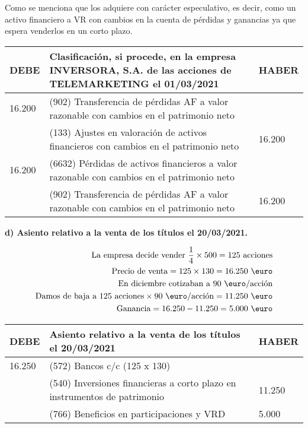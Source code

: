 Como se menciona que los adquiere con carácter especulativo, es decir, como un activo financiero a VR con cambios en la cuenta de pérdidas y ganancias ya que espera venderlos en un corto plazo.

\begin{table}[H]
    \centering
    \begin{tabular}{|p{3cm}|p{6cm}|p{3cm}|}
    \hline
    \rowcolor{blue!30}
    \textbf{DEBE} & \textbf{Clasificación, si procede, en la empresa INVERSORA, S.A. de las acciones de TELEMARKETING el 01/03/2021} & \textbf{HABER} \\
    \hline
    16.200 & (902) Transferencia de pérdidas AF a valor razonable con cambios en el patrimonio neto & \\
    \hline
    & (133) Ajustes en valoración de activos financieros con cambios en el patrimonio neto & 16.200 \\
    \hline
    16.200 & (6632) Pérdidas de activos financieros a valor razonable con cambios en el patrimonio neto & \\
    \hline
    & (902) Transferencia de pérdidas AF a valor razonable con cambios en el patrimonio neto & 16.200 \\
    \hline
    \end{tabular}
\end{table}

\textbf{d) Asiento relativo a la venta de los títulos el 20/03/2021.}

\begin{align*}
    \text{La empresa decide vender } \frac{1}{4} \times 500 = 125 \text{ acciones} \\
    \text{Precio de venta} = 125 \times 130 = 16.250 \text{ \euro}\\
    \text{En diciembre cotizaban a 90 \euro/acción} \\
    \text{Damos de baja a } 125 \text{ acciones} \times 90 \text{ \euro/acción} = 11.250 \text{ \euro} \\
    \text{Ganancia} = 16.250 - 11.250 = 5.000 \text{ \euro}
\end{align*}

\begin{table}[H]
    \centering
    \begin{tabular}{|p{3cm}|p{6cm}|p{3cm}|}
    \hline
    \rowcolor{blue!30}
    \textbf{DEBE} & \textbf{Asiento relativo a la venta de los títulos el 20/03/2021} & \textbf{HABER} \\
    \hline
    16.250 & (572) Bancos c/c (125 x 130) & \\
    \hline
    & (540) Inversiones financieras a corto plazo en instrumentos de patrimonio & 11.250 \\
    \hline
    & (766) Beneficios en participaciones y VRD & 5.000 \\
    \hline
    \end{tabular}
\end{table}


